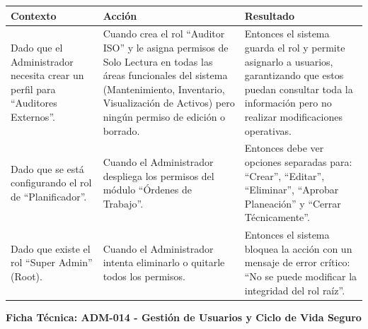 \footnotesize\begin{longtable}{|p{0.28\textwidth}|p{0.32\textwidth}|p{0.34\textwidth}|}\hline
\textbf{Contexto} & \textbf{Acción} & \textbf{Resultado} \\ \hline
\parbox[t]{\linewidth}{Dado que el Administrador necesita crear un perfil para ``Auditores Externos''.} & \parbox[t]{\linewidth}{Cuando crea el rol ``Auditor ISO'' y le asigna permisos de Solo Lectura en todas las áreas funcionales del sistema (Mantenimiento, Inventario, Visualización de Activos) pero ningún permiso de edición o borrado.} & \parbox[t]{\linewidth}{Entonces el sistema guarda el rol y permite asignarlo a usuarios, garantizando que estos puedan consultar toda la información pero no realizar modificaciones operativas.} \\ \hline
\parbox[t]{\linewidth}{Dado que se está configurando el rol de ``Planificador''.} & \parbox[t]{\linewidth}{Cuando el Administrador despliega los permisos del módulo ``Órdenes de Trabajo''.} & \parbox[t]{\linewidth}{Entonces debe ver opciones separadas para: ``Crear'', ``Editar'', ``Eliminar'', ``Aprobar Planeación'' y ``Cerrar Técnicamente''.} \\ \hline
\parbox[t]{\linewidth}{Dado que existe el rol ``Super Admin'' (Root).} & \parbox[t]{\linewidth}{Cuando el Administrador intenta eliminarlo o quitarle todos los permisos.} & \parbox[t]{\linewidth}{Entonces el sistema bloquea la acción con un mensaje de error crítico: ``No se puede modificar la integridad del rol raíz''.} \\ \hline
\end{longtable}\normalsize
\vspace{1em}
\noindent\textbf{Ficha Técnica: ADM-014 - Gestión de Usuarios y Ciclo de Vida Seguro}
\footnotesize\setlength{\tabcolsep}{4pt}\renewcommand{\arraystretch}{1.2}
